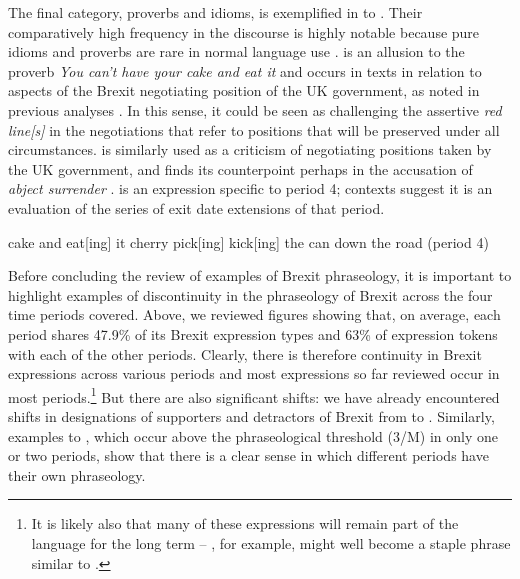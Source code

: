 \documentclass[output=paper]{langscibook}
\begin{document}
The final category, proverbs and idioms, is exemplified in  to . Their comparatively high frequency in the discourse is highly notable because pure idioms and proverbs are rare in normal language use \citep{Moon1998}.  is an allusion to the proverb \textit{You can’t have your cake and eat it} and occurs in texts in relation to aspects of the Brexit negotiating position of the UK government, as noted in previous analyses \citep{Charteris-Black2019,Musolff2019}. In this sense, it could be seen as challenging the assertive \textit{red line[s]}  in the negotiations that refer to positions that will be preserved under all circumstances.  is similarly used as a criticism of negotiating positions taken by the UK government, and finds its counterpoint perhaps in the accusation of \textit{abject surrender} .  is an expression specific to period 4; contexts suggest it is an evaluation of the series of exit date extensions of that period. 

\ea\relax [have] cake and eat[ing] it\label{ex:buerki:53}
\ex cherry pick[ing]\label{ex:buerki:54}
\ex kick[ing] the can down the road (period 4)\label{ex:buerki:55}
\z

Before concluding the review of examples of Brexit phraseology, it is important to highlight examples of discontinuity in the phraseology of Brexit across the four time periods covered. Above, we reviewed figures showing that, on average, each period shares 47.9\% of its Brexit expression types and 63\% of expression tokens with each of the other periods. Clearly, there is therefore continuity in Brexit expressions across various periods and most expressions so far reviewed occur in most periods.\footnote{It is likely also that many of these expressions will remain part of the language for the long term -- , for example, might well become a staple phrase similar to .} But there are also significant shifts: we have already encountered shifts in designations of supporters and detractors of Brexit from  to . Similarly, examples  to , which occur above the phraseological threshold (3/M) in only one or two periods, show that there is a clear sense in which different periods have their own phraseology.
\end{document}
